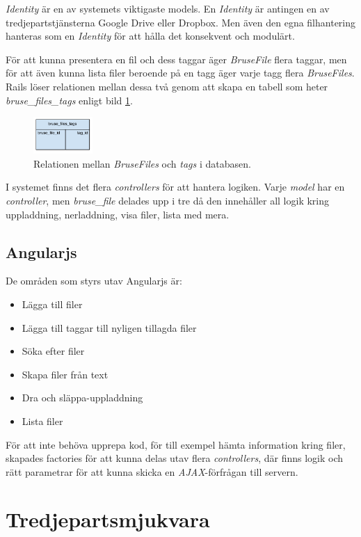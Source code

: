 \emph{Identity} är en av  systemets viktigaste models. En \emph{Identity} är
antingen en av tredjepartstjänsterna Google Drive eller Dropbox. Men även den
egna filhantering hanteras som en \emph{Identity} för att hålla det konsekvent
och modulärt.

För att kunna presentera en fil och dess taggar äger \emph{BruseFile} flera
taggar, men för att även kunna lista filer beroende på en tagg äger varje tagg
flera \emph{BruseFiles}. Rails löser relationen mellan dessa två genom att skapa
en tabell som heter \emph{bruse_files_tags} enligt bild
\ref{fig:bruse_files_tags}.

\begin{figure}[!h]
\centering
\includegraphics[width=0.2\textwidth]{figures/bruse_files_tags.png}
\caption{Relationen mellan \emph{BruseFiles} och \emph{tags} i databasen.}
\label{fig:bruse_files_tags}
\end{figure}

I systemet finns det flera \emph{controllers} för att hantera logiken. Varje
\emph{model} har en \emph{controller}, men \emph{bruse_file} delades upp i tre
då den innehåller all logik kring uppladdning, nerladdning, visa filer, lista
med mera.

\subsection{Angularjs}
De områden som styrs utav Angularjs är:
\begin{itemize}
  \item Lägga till filer
  \item Lägga till taggar till nyligen tillagda filer
  \item Söka efter filer
  \item Skapa filer från text
  \item Dra och släppa-uppladdning
  \item Lista filer
\end{itemize}

För att inte behöva upprepa kod, för till exempel hämta information kring filer,
skapades factories för att kunna delas utav flera \emph{controllers}, där finns
logik och rätt parametrar för att kunna skicka en \emph{AJAX}-förfrågan till
servern.

\section{Tredjepartsmjukvara}

